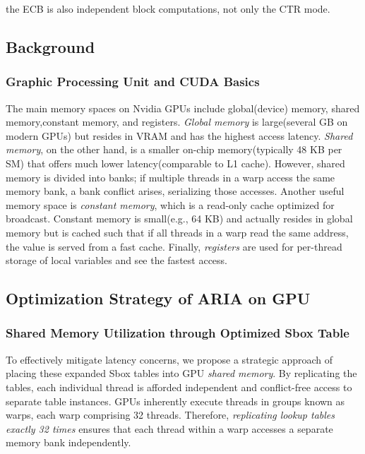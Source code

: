 \documentclass[a4paper]{article}
\begin{document}
\begin{note}
  the ECB is also independent block computations, not only the CTR mode.
\end{note}

\subsection{Background}

\subsubsection{Graphic Processing Unit and CUDA Basics}

The main memory spaces on Nvidia GPUs include global(device) memory, shared memory,constant memory, and registers. \textit{Global memory} is large(several GB on modern GPUs) but resides in VRAM and has the highest access latency. \textit{Shared memory}, on the other hand, is a smaller on-chip memory(typically 48 KB per SM) that offers much lower latency(comparable to L1 cache). However, shared memory is divided into banks; if multiple threads in a warp access the same memory bank, a bank conflict arises, serializing those accesses. Another useful memory space is \textit{constant memory}, which is a read-only cache optimized for broadcast. Constant memory is small(e.g., 64 KB) and actually resides in global memory but is cached such that if all threads in a warp read the same address, the value is served from a fast cache. Finally, \textit{registers} are used for per-thread storage of local variables and see the fastest access.

\subsection{Optimization Strategy of ARIA on GPU}
\subsubsection{Shared Memory Utilization through Optimized Sbox Table}

To effectively mitigate latency concerns, we propose a strategic approach of placing these expanded Sbox tables into GPU \textit{shared memory}. By replicating the tables, each individual thread is afforded independent and conflict-free access to separate table instances. GPUs inherently execute threads in groups known as warps, each warp comprising 32 threads. Therefore, \textit{replicating lookup tables exactly 32 times }ensures that each thread within a warp accesses a separate memory bank independently.
\end{document}
